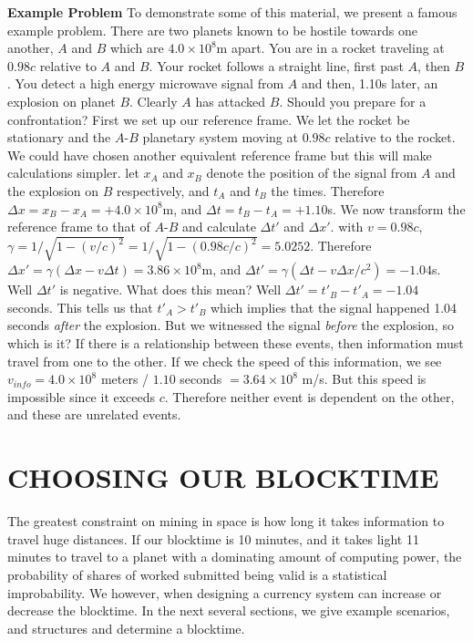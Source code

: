 \documentclass[conference]{IEEEtran}
\begin{document}
\textbf{Example Problem} To demonstrate some of this material, we present a famous example problem. There are two planets known to be hostile towards one another, $A$ and $B$ which are $4.0 \times 10^8 $m apart. You are in a rocket traveling at $0.98c$ relative to $A$ and $B$. Your rocket follows a straight line, first past $A$, then $B$. You detect a high energy microwave signal from $A$ and then, 1.10s later, an explosion on planet $B$. Clearly $A$ has attacked $B$. Should you prepare for a confrontation? First we set up our reference frame. We let the rocket be stationary and the $A$-$B$ planetary system moving at $0.98c$ relative to the rocket. We could have chosen another equivalent reference frame but this will make calculations simpler. let $x_A$ and $x_B$ denote the position of the signal from $A$ and the explosion on $B$ respectively, and $t_A$ and $t_B$ the times. Therefore $\Delta x = x_B - x_A = +4.0 \times 10^8$m, and $\Delta t = t_B - t_A = +1.10$s. We now transform the reference frame to that of $A$-$B$ and calculate $\Delta t'$ and $\Delta x'$. with $v = 0.98c$, $\gamma = 1/\sqrt{1-(v/c)^2} = 1/\sqrt{1-(0.98c/c)^2} = 5.0252$. Therefore $\Delta x' = \gamma(\Delta x - v\Delta t) = 3.86 \times 10^8$m, and $\Delta t' = \gamma (\Delta t - v\Delta x/c^2) = -1.04$s. Well $\Delta t'$ is negative. What does this mean? Well $\Delta t' = t'_B - t'_A = -1.04$ seconds. This tells us that $t'_A > t'_B$ which implies that the signal happened 1.04 seconds \textit{after} the explosion. But we witnessed the signal \textit{before} the explosion, so which is it? If there is a relationship between these events, then information must travel from one to the other. If we check the speed of this information, we see $v_{info} = 4.0 \times 10^8$ meters / $1.10$ seconds $ = 3.64 \times 10^8$ m/s. But this speed is impossible since it exceeds $c$. Therefore neither event is dependent on the other, and these are unrelated events.
 
\section{CHOOSING OUR BLOCKTIME}
The greatest constraint on mining in space is how long it takes information to travel huge distances. If our blocktime is 10 minutes, and it takes light 11 minutes to travel to a planet with a dominating amount of computing power, the probability of shares of worked submitted being valid is a statistical improbability. We however, when designing a currency system can increase or decrease the blocktime. In the next several sections, we give example scenarios, and structures and determine a blocktime. 
\end{document}
